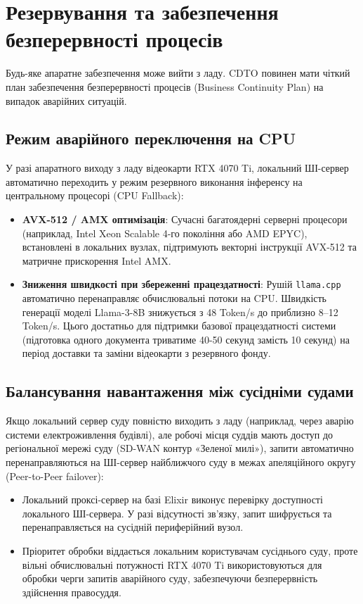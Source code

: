 \documentclass{article}
\begin{document}
\section{Резервування та забезпечення безперервності процесів}
Будь-яке апаратне забезпечення може вийти з ладу. CDTO повинен мати чіткий план забезпечення безперервності процесів (Business Continuity Plan) на випадок аварійних ситуацій.

\subsection{Режим аварійного переключення на CPU}
У разі апаратного виходу з ладу відеокарти RTX 4070 Ti, локальний ШІ-сервер автоматично переходить у режим резервного виконання інференсу на центральному процесорі (CPU Fallback):
\begin{itemize}
\item \textbf{AVX-512 / AMX оптимізація}: Сучасні багатоядерні серверні процесори (наприклад, Intel Xeon Scalable 4-го покоління або AMD EPYC), встановлені в локальних вузлах, підтримують векторні інструкції AVX-512 та матричне прискорення Intel AMX.
\item \textbf{Зниження швидкості при збереженні працездатності}: Рушій \texttt{llama.cpp} автоматично перенаправляє обчислювальні потоки на CPU. Швидкість генерації моделі Llama-3-8B знижується з 48 Token/s до приблизно 8--12 Token/s. Цього достатньо для підтримки базової працездатності системи (підготовка одного документа триватиме 40-50 секунд замість 10 секунд) на період доставки та заміни відеокарти з резервного фонду.
\end{itemize}

\subsection{Балансування навантаження між сусідніми судами}
Якщо локальний сервер суду повністю виходить з ладу (наприклад, через аварію системи електроживлення будівлі), але робочі місця суддів мають доступ до регіональної мережі суду (SD-WAN контур «Зеленої милі»), запити автоматично перенаправляються на ШІ-сервер найближчого суду в межах апеляційного округу (Peer-to-Peer failover):
\begin{itemize}
\item Локальний проксі-сервер на базі Elixir виконує перевірку доступності локального ШІ-сервера. У разі відсутності зв'язку, запит шифрується та перенаправляється на сусідній периферійний вузол.
\item Пріоритет обробки віддається локальним користувачам сусіднього суду, проте вільні обчислювальні потужності RTX 4070 Ti використовуються для обробки черги запитів аварійного суду, забезпечуючи безперервність здійснення правосуддя.
\end{itemize}
\end{document}
